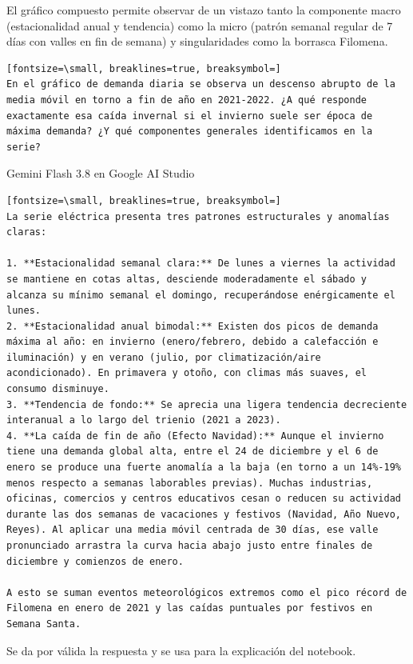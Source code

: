 \documentclass[12pt,a4paper,oneside]{book}
\begin{document}
\begin{iaanalisis}
El gráfico compuesto permite observar de un vistazo tanto la componente macro (estacionalidad anual y tendencia) como la micro (patrón semanal regular de 7 días con valles en fin de semana) y singularidades como la borrasca Filomena.
\end{iaanalisis}

\begin{iaprompt}
\begin{Verbatim}[fontsize=\small, breaklines=true, breaksymbol=]
En el gráfico de demanda diaria se observa un descenso abrupto de la media móvil en torno a fin de año en 2021-2022. ¿A qué responde exactamente esa caída invernal si el invierno suele ser época de máxima demanda? ¿Y qué componentes generales identificamos en la serie?
\end{Verbatim}
\end{iaprompt}
\begin{iaresp}{Gemini Flash 3.8 en Google AI Studio}
\begin{Verbatim}[fontsize=\small, breaklines=true, breaksymbol=]
La serie eléctrica presenta tres patrones estructurales y anomalías claras:

1. **Estacionalidad semanal clara:** De lunes a viernes la actividad se mantiene en cotas altas, desciende moderadamente el sábado y alcanza su mínimo semanal el domingo, recuperándose enérgicamente el lunes.
2. **Estacionalidad anual bimodal:** Existen dos picos de demanda máxima al año: en invierno (enero/febrero, debido a calefacción e iluminación) y en verano (julio, por climatización/aire acondicionado). En primavera y otoño, con climas más suaves, el consumo disminuye.
3. **Tendencia de fondo:** Se aprecia una ligera tendencia decreciente interanual a lo largo del trienio (2021 a 2023).
4. **La caída de fin de año (Efecto Navidad):** Aunque el invierno tiene una demanda global alta, entre el 24 de diciembre y el 6 de enero se produce una fuerte anomalía a la baja (en torno a un 14%-19% menos respecto a semanas laborables previas). Muchas industrias, oficinas, comercios y centros educativos cesan o reducen su actividad durante las dos semanas de vacaciones y festivos (Navidad, Año Nuevo, Reyes). Al aplicar una media móvil centrada de 30 días, ese valle pronunciado arrastra la curva hacia abajo justo entre finales de diciembre y comienzos de enero.

A esto se suman eventos meteorológicos extremos como el pico récord de Filomena en enero de 2021 y las caídas puntuales por festivos en Semana Santa.
\end{Verbatim}
\end{iaresp}
\begin{iaanalisis}
Se da por válida la respuesta y se usa para la explicación del notebook.
\end{iaanalisis}
\end{document}
